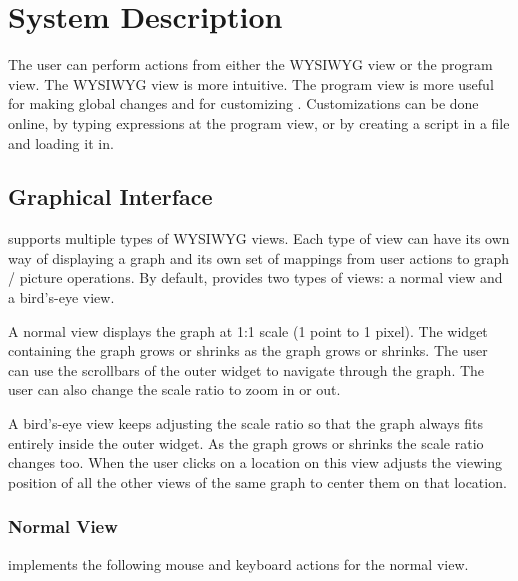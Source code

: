 \chapter{System Description}
The user can perform actions from either the WYSIWYG view or the program view.
The WYSIWYG view is more intuitive. The program view is more useful for making
global changes and for customizing {\DOTTY}. Customizations can be done online,
by typing {\LEFTY} expressions at the program view, or by creating a {\LEFTY}
script in a file and loading it in.

\section{Graphical Interface}
\label{gi}
{\DOTTY} supports multiple types of WYSIWYG views. Each type of view can have
its own way of displaying a graph and its own set of mappings from user actions
to graph / picture operations. By default, {\DOTTY} provides two types of
views: a normal view and a bird's-eye view.

A normal view displays the graph at 1:1 scale (1 {\DOT} point to 1 pixel).  The
widget containing the graph grows or shrinks as the graph grows or shrinks. The
user can use the scrollbars of the outer widget to navigate through the
graph. The user can also change the scale ratio to zoom in or out.

A bird's-eye view keeps adjusting the scale ratio so that the graph always fits
entirely inside the outer widget. As the graph grows or shrinks the scale ratio
changes too. When the user clicks on a location on this view {\DOTTY} adjusts
the viewing position of all the other views of the same graph to center them on
that location.

\subsection{Normal View}
{\DOTTY} implements the following mouse and keyboard actions for the normal
view.


